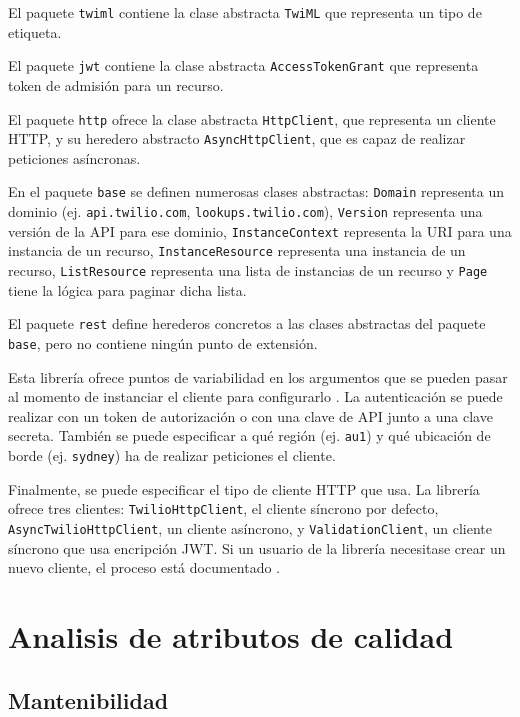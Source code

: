\documentclass{article}
\begin{document}
El paquete \verb|twiml| contiene la clase abstracta \verb|TwiML|
que representa un tipo de etiqueta.

El paquete \verb|jwt| contiene la clase abstracta \verb|AccessTokenGrant|
que representa token de admisión para un recurso.

El paquete \verb|http| ofrece la clase abstracta
\verb|HttpClient|, que representa un cliente HTTP,
y su heredero abstracto \verb|AsyncHttpClient|,
que es capaz de realizar peticiones asíncronas.

En el paquete \verb|base| se definen numerosas clases abstractas:
\verb|Domain| representa un dominio
(ej. \verb|api.twilio.com|, \verb|lookups.twilio.com|),
\verb|Version| representa una versión de la API para ese dominio,
\verb|InstanceContext| representa la URI para una instancia de un recurso,
\verb|InstanceResource| representa una instancia de un recurso,
\verb|ListResource| representa una lista de instancias de un recurso
y \verb|Page| tiene la lógica para paginar dicha lista.

El paquete \verb|rest| define herederos concretos a las clases abstractas
del paquete \verb|base|, pero no contiene ningún punto de extensión.

\hfill

Esta librería ofrece puntos de variabilidad
en los argumentos que se pueden pasar
al momento de instanciar el cliente para configurarlo
\cite{readme}.
La autenticación se puede realizar con un token de autorización o
con una clave de API junto a una clave secreta.
También se puede especificar a qué región (ej. \verb|au1|)
y qué ubicación de borde (ej. \verb|sydney|)
ha de realizar peticiones el cliente.

Finalmente, se puede especificar el tipo de cliente HTTP que usa.
La librería ofrece tres clientes:
\verb|TwilioHttpClient|, el cliente síncrono por defecto,
\verb|AsyncTwilioHttpClient|, un cliente asíncrono, y
\verb|ValidationClient|, un cliente síncrono que usa encripción JWT.
Si un usuario de la librería necesitase crear un nuevo cliente,
el proceso está documentado
\cite{crear-cliente-http}.

\section{Analisis de atributos de calidad}

\subsection{Mantenibilidad}
\end{document}
